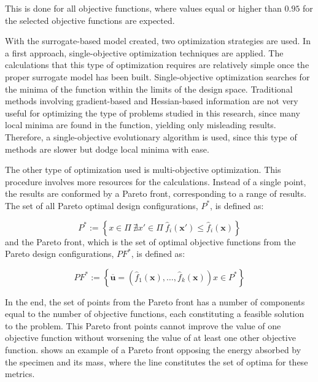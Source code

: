 \documentclass[cmfonts]{witpress}
\begin{document}
This is done for all objective functions, where values equal or higher than $0.95$ for the selected objective functions are expected. 

With the surrogate-based model created, two optimization strategies are used. In a first approach, single-objective optimization techniques are applied. The calculations that this type of optimization requires are relatively simple once the proper surrogate model has been built. Single-objective optimization searches for the minima of the function within the limits of the design space. Traditional methods involving gradient-based and Hessian-based information are not very useful for optimizing the type of problems studied in this research, since many local minima are found in the function, yielding only misleading results. Therefore, a single-objective evolutionary algorithm is used, since this type of methods are slower but dodge local minima with ease.

The other type of optimization used is multi-objective optimization. This procedure involves more resources for the calculations. Instead of a single point, the results are conformed by a Pareto front, corresponding to a range of results. The set of all Pareto optimal design configurations, $P^*$, is defined as:

\begin{equation}
P^* := \left\{ x \in \Pi \   \nexists x' \in \Pi \    \hat{f}_i \left( \bm{x'} \right) \leqslant \hat{f}_i \left( \bm{x} \right)  \right\}
\end{equation}
and the Pareto front, which is the set of optimal objective functions from the Pareto design configurations, $PF^*$, is defined as:

\begin{equation}
PF^* := \left\{ \overline{\bm{u}} = \left( \hat{f}_1 \left( \bm{x} \right), \ldots , \hat{f}_k \left( \bm{x} \right) \right)  x \in P^* \right\}
\end{equation}

In the end, the set of points from the Pareto front has a number of components equal to the number of objective functions, each constituting a feasible solution to the problem. This Pareto front points cannot improve the value of one objective function without worsening the value of at least one other objective function.  shows an example of a Pareto front opposing the energy absorbed by the specimen and its mass, where the line constitutes the set of optima for these metrics.
\end{document}
